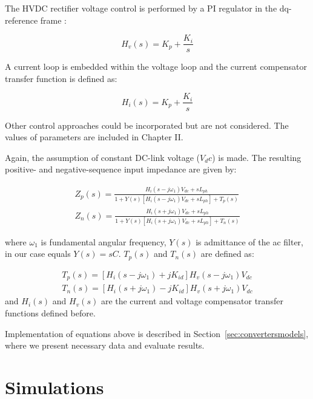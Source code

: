 \documentclass[12pt]{report} %
\begin{document}
The HVDC rectifier voltage control is performed by a PI regulator in the dq-reference frame \cite{liusun2014}:

\begin{equation}
	H_v (s)=K_p +\dfrac{K_i}{s}
\end{equation}

A current loop is embedded within the voltage loop and the current compensator transfer function is defined as:

\begin{equation}
	H_i (s)=K_p +\dfrac{K_i}{s}
\end{equation}

Other control approaches could be incorporated but are not considered. The values of parameters are included in Chapter II.

Again, the assumption of constant DC-link voltage ($V_dc$) is made. The resulting positive- and negative-sequence input impedance are given by:

\begin{equation} \label{eq:impedance_hvdc}
\begin{aligned}
	Z_p (s)=\frac{H_i (s-j\omega_1)V_{dc} +sL_{ph}}{1+Y(s)[H_i (s-j\omega_1 )V_{dc} +sL_{ph} ]+T_p (s)} \\
	Z_n (s)=\frac{H_i (s+j\omega_1)V_{dc} +sL_{ph}}{1+Y(s)[H_i (s+j\omega_1 )V_{dc} +sL_{ph} ]+T_n (s)}
\end{aligned}
\end{equation}

where $\omega_1$ is fundamental angular frequency, $Y(s)$ is admittance of the ac filter, in our case equals $Y(s)=sC$. $T_p (s)$ and $T_n (s)$ are defined as:

\begin{equation}
\begin{aligned}
	T_p (s)=[H_i (s-j\omega_1 )+jK_{id} ]H_v (s-j\omega_1 )V_{dc} \\
	T_n (s)=[H_i (s+j\omega_1 )-jK_{id} ]H_v (s+j\omega_1 )V_{dc}
\end{aligned}
\end{equation}
and $H_i (s)$ and $H_v (s)$ are the current and voltage compensator transfer functions defined before.

Implementation of equations above is described in Section~\ref{sec:convertersmodels}, where we present necessary data and evaluate results.

\chapter{Simulations} \label{ch2}
\end{document}
